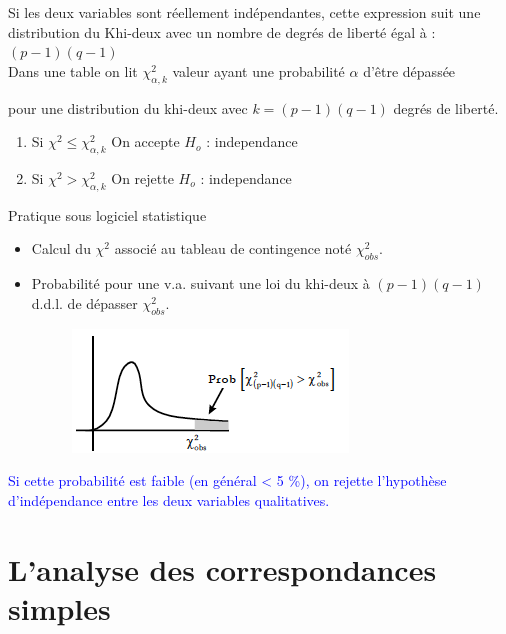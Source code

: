 \documentclass[12pt]{beamer}
\begin{document}
\begin{frame}{}

Si les deux variables sont réellement indépendantes, cette expression suit une distribution du Khi-deux avec un nombre de degrés de liberté égal
à : $(p -1) (q -1)$\\

Dans une table on lit $\chi_{\alpha,k}^2$ valeur ayant une probabilité
$\alpha$ d’être dépassée


pour une distribution du khi-deux avec $k = (p-1) (q -1)$
degrés de liberté.

\begin{enumerate}
\item Si $\chi^2\leq \chi_{\alpha,k}^2$  On accepte $H_o$ : independance 
\item  Si $\chi^2 > \chi_{\alpha,k}^2$  On rejette $H_o$ : independance 
\end{enumerate}

\end{frame}
\begin{frame}{Pratique sous logiciel statistique}

\begin{itemize}
\item  Calcul du $\chi^2$ associé au tableau de contingence noté $\chi^2_{obs}$.

\item Probabilité pour une v.a. suivant une loi du khi-deux à
$(p -1) (q -1)$ d.d.l. de dépasser $\chi^2_{obs}$.

\begin{figure}
\includegraphics[scale=0.8]{exemple7.png}  
\end{figure}

\end{itemize}


\textcolor{blue}{Si cette probabilité est faible (en général < 5 \%), on rejette l’hypothèse d’indépendance entre les deux variables qualitatives.}


\end{frame}


\section{L’analyse des correspondances simples}
 
\end{document}
